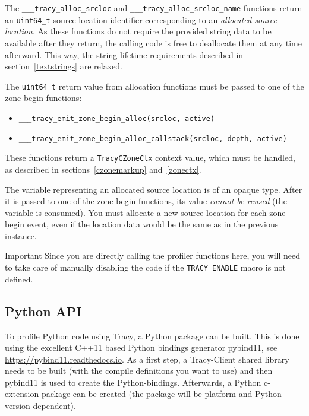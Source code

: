 \documentclass[hidelinks,titlepage,a4paper,twoside]{article}
\begin{document}
The \texttt{\_\_\_tracy\_alloc\_srcloc} and \texttt{\_\_\_tracy\_alloc\_srcloc\_name} functions
return an \texttt{uint64\_t} source location identifier corresponding to an \emph{allocated source
location}. As these functions do not require the provided string data to be available after they
return, the calling code is free to deallocate them at any time afterward. This way, the string
lifetime requirements described in section~\ref{textstrings} are relaxed.

The \texttt{uint64\_t} return value from allocation functions must be passed to one of the zone
begin functions:

\begin{itemize}
\item \texttt{\_\_\_tracy\_emit\_zone\_begin\_alloc(srcloc, active)}
\item \texttt{\_\_\_tracy\_emit\_zone\_begin\_alloc\_callstack(srcloc, depth, active)}
\end{itemize}


These functions return a \texttt{TracyCZoneCtx} context value, which must be handled, as described
in sections~\ref{czonemarkup} and~\ref{zonectx}.

The variable representing an allocated source location is of an opaque type. After it is passed to one of the zone begin functions, its value \emph{cannot be reused} (the variable is consumed). You must allocate a new source location for each zone begin event, even if the location data would be the same as in the previous instance.

\begin{bclogo}[
noborder=true,
couleur=black!5,
logo=\bcbombe
]{Important}
Since you are directly calling the profiler functions here, you will need to take care of manually
disabling the code if the \texttt{TRACY\_ENABLE} macro is not defined.
\end{bclogo}

\subsection{Python API}
\label{pythonapi}

To profile Python code using Tracy, a Python package can be built. This is done using the excellent C++11 based Python bindings generator pybind11, see \url{https://pybind11.readthedocs.io}.
As a first step, a Tracy-Client shared library needs to be built (with the compile definitions you want to use) and then pybind11 is used to create the Python-bindings.
Afterwards, a Python c-extension package can be created (the package will be platform and Python version dependent).
\end{document}
